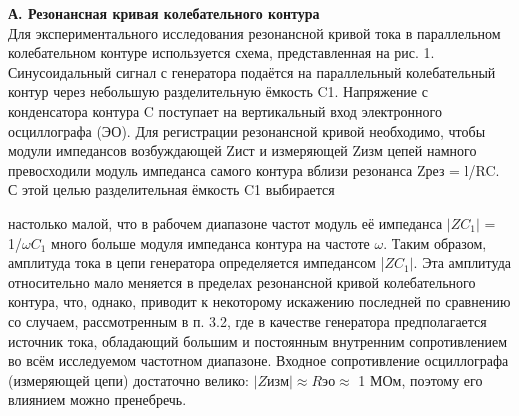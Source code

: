 \documentclass[a4paper, 12pt]{article}%
\begin{document}
	\textbf{А. Резонансная кривая колебательного контура}\\
	Для экспериментального исследования резонансной кривой тока в
	параллельном колебательном контуре используется схема, представленная на рис. 1. Синусоидальный сигнал с генератора подаётся на параллельный колебательный контур через небольшую разделительную ёмкость C1. Напряжение с конденсатора контура C поступает на вертикальный вход электронного осциллографа (ЭО). Для регистрации резонансной кривой необходимо, чтобы модули импедансов возбуждающей Zист и измеряющей Zизм цепей намного превосходили модуль импеданса самого контура вблизи резонанса Zрез = l/RC. С этой целью разделительная ёмкость C1 выбирается
	
	\begin{figure}[h]
	\end{figure}
	
	\newpage
	
	настолько малой, что в рабочем диапазоне частот модуль её импеданса
	$|ZC_1|$ = 1/$\omega C_1$ много больше модуля импеданса контура на частоте $\omega$.
	Таким образом, амплитуда тока в цепи генератора определяется импедансом |$ZC_1|$. Эта амплитуда относительно мало меняется в пределах резонансной кривой колебательного контура, что, однако, приводит к некоторому искажению последней по сравнению со случаем, рассмотренным в
	п. 3.2, где в качестве генератора предполагается источник тока, обладающий большим и постоянным внутренним сопротивлением во всём исследуемом частотном диапазоне. Входное сопротивление осциллографа (измеряющей цепи) достаточно велико: $|Zизм| \approx Rэо \approx$ 1 МОм, поэтому его влиянием можно пренебречь.
	
\end{document}
